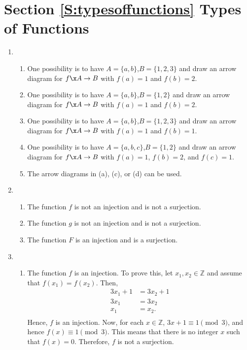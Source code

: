 \section*{Section \ref{S:typesoffunctions} Types of Functions}

\begin{enumerate}
\item \begin{enumerate}
\item One possibility is to have $A = \{a, b \}$,$B = \{ 1, 2, 3 \}$ and draw an arrow diagram for $f\x A \to B$ with $f(a) = 1$ and $f(b) = 2$.

\item One possibility is to have $A = \{a, b \}$,$B = \{ 1, 2 \}$ and draw an arrow diagram for $f\x A \to B$ with $f(a) = 1$ and $f(b) = 2$.

\item One possibility is to have $A = \{a, b \}$,$B = \{ 1, 2, 3 \}$ and draw an arrow diagram for $f\x A \to B$ with $f(a) = 1$ and $f(b) = 1$.

\item One possibility is to have $A = \{a, b, c \}$,$B = \{ 1, 2 \}$ and draw an arrow diagram for $f\x A \to B$ with $f(a) = 1$, $f(b) = 2$, and $f(c) = 1$.

\item The arrow diagrams in (a), (c), or (d) can be used.
\end{enumerate}


\item \begin{enumerate}
\item The function $f$ is not an injection and is not a surjection.

\item The function $g$ is not an injection and is not a surjection.

\item The function $F$ is an injection and is a surjection.
\end{enumerate}


\item \begin{enumerate}
\item The function $f$ is an injection.  To prove this, let $x_1, x_2 \in \mathbb{Z}$ and assume that $f ( x_1 ) = f ( x_2 )$.  Then,
\[
\begin{aligned}
3x_1 + 1 &= 3x_2 + 1 \\
    3x_1 &= 3x_2 \\
     x_1 &= x_2. \\
\end{aligned}
\]
Hence, $f$ is an injection.  Now, for each $x \in \mathbb{Z}$, $3x + 1 \equiv 1 \pmod 3$, and hence 
$f ( x ) \equiv 1 \pmod 3$.  This means that there is no integer $x$ such that 
$f ( x ) = 0$.  Therefore, $f$ is not a surjection.


\end{enumerate}
\end{enumerate}
